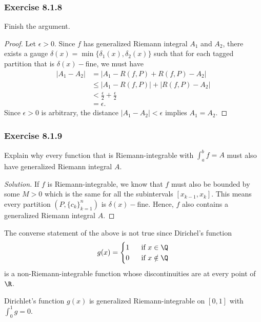\subsubsection{Exercise 8.1.8} Finish the argument.
\begin{proof}
Let \( \epsilon > 0  \). Since \( f  \) has generalized Riemann integral \( A_{1} \) and \( A_{2} \), there exists a gauge \( \delta(x) = \min \{ \delta_1(x), \delta_2(x)  \}  \) such that for each tagged partition that is \( \delta(x)- \)fine, we must have
\begin{align*}
    | A_{1} - A_{2} | &= \Big| A_{1} - R(f,P) + R(f,P) - A_{2} \Big|   \\
                      &\leq | A_{1} - R(f,P)  | + | R(f,P) - A_{2} | \\
                      &< \frac{ \epsilon  }{ 2 }  + \frac{ \epsilon  }{ 2 } \\
                      &= \epsilon.
\end{align*}
Since \( \epsilon > 0  \) is arbitrary, the distance \( | A_{1} - A_{2}  | < \epsilon \) implies \( A_{1} = A_{2} \).
\end{proof}

\subsubsection{Exercise 8.1.9} Explain why every function that is Riemann-integrable with \( \int_{ a }^{ b } f = A  \) must also have generalized Riemann integral \( A  \).
\begin{proof}[Solution]
    If \( f \) is Riemann-integrable, we know that \( f  \) must also be bounded by some \( M > 0  \) which is the same for all the subintervals \( [ x_{k-1}, x_{k }] \). This means every partition \( (P, \{ c_{k } \}_{k=1}^n) \) is \( \delta(x)- \)fine. Hence, \( f  \) also contains a generalized Riemann integral \( A  \). 
\end{proof}

The converse statement of the above is not true since Dirichel's function 
\[  g(x) = 
\begin{cases}
    1 \ &\text{ if } x \in \Q \\
    0 \ &\text{ if } x \notin \Q 
\end{cases} \]
is a non-Riemann-integrable function whose discontinuities are at every point of \( \R  \).

\begin{tcolorbox}
\begin{thm}
    Dirichlet's function \( g(x)  \) is generalized Riemann-integrable on \( [0,1]  \) with \( \int_{ 0 }^{ 1 } g = 0  \).
\end{thm}
\end{tcolorbox}

